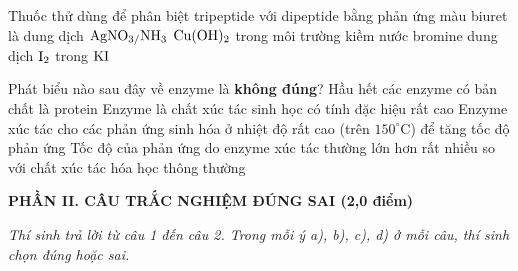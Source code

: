 \documentclass[11pt,a4paper]{article}
\begin{document}
\begin{ex}
Thuốc thử dùng để phân biệt tripeptide với dipeptide bằng phản ứng màu biuret là
\choice
{dung dịch $\ce{AgNO3/NH3}$}
{\True $\ce{Cu(OH)2}$ trong môi trường kiềm}
{nước bromine}
{dung dịch $\ce{I2}$ trong $\ce{KI}$}

\end{ex}
\begin{ex}
Phát biểu nào sau đây về enzyme là \textbf{không đúng}?
\choice
{Hầu hết các enzyme có bản chất là protein}
{Enzyme là chất xúc tác sinh học có tính đặc hiệu rất cao}
{\True Enzyme xúc tác cho các phản ứng sinh hóa ở nhiệt độ rất cao (trên $150^\circ\text{C}$) để tăng tốc độ phản ứng}
{Tốc độ của phản ứng do enzyme xúc tác thường lớn hơn rất nhiều so với chất xúc tác hóa học thông thường}

\end{ex}
\vspace{6pt}
\noindent
{\color{mainGreen}\textbf{\large PHẦN II. CÂU TRẮC NGHIỆM ĐÚNG SAI (2,0 điểm)}}

\textit{Thí sinh trả lời từ câu 1 đến câu 2. Trong mỗi ý a), b), c), d) ở mỗi câu, thí sinh chọn đúng hoặc sai.}

\vspace{2pt}
\end{document}
